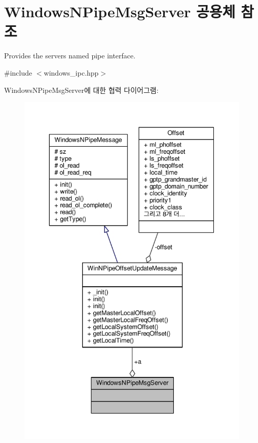\hypertarget{union_windows_n_pipe_msg_server}{}\section{Windows\+N\+Pipe\+Msg\+Server 공용체 참조}
\label{union_windows_n_pipe_msg_server}


Provides the server\textquotesingle{}s named pipe interface.  




{\ttfamily \#include $<$windows\+\_\+ipc.\+hpp$>$}



Windows\+N\+Pipe\+Msg\+Server에 대한 협력 다이어그램\+:
\nopagebreak
\begin{figure}[H]
\begin{center}
\leavevmode
\includegraphics[width=342pt]{union_windows_n_pipe_msg_server__coll__graph}
\end{center}
\end{figure}
